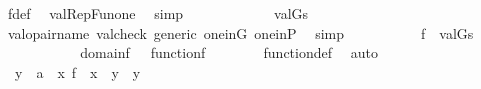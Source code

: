 \begin{isabellebody}
\ f{\isacharunderscore}{\kern0pt}def\ \isamarkupfalse%
\ val{\isacharunderscore}{\kern0pt}RepFun{\isacharunderscore}{\kern0pt}one\ \isamarkupfalse%
\ simp\isanewline
\ \ \ \ \isamarkupfalse%
\isanewline
\ \ \ \ \isamarkupfalse%
\ {\isachardoublequoteopen}{\isachardot}{\kern0pt}{\isachardot}{\kern0pt}{\isachardot}{\kern0pt}\ {\isacharequal}{\kern0pt}\ {\isacharbraceleft}{\kern0pt}{\isasymlangle}{\isasymbeta}{\isacharcomma}{\kern0pt}val{\isacharparenleft}{\kern0pt}G{\isacharcomma}{\kern0pt}s{\isacharbackquote}{\kern0pt}{\isasymbeta}{\isacharparenright}{\kern0pt}{\isasymrangle}\ {\isachardot}{\kern0pt}\ {\isasymbeta}{\isasymin}{\isasymalpha}{\isacharbraceright}{\kern0pt}{\isachardoublequoteclose}\isanewline
\ \ \ \ \ \ \isamarkupfalse%
\ val{\isacharunderscore}{\kern0pt}opair{\isacharunderscore}{\kern0pt}name\ valcheck\ generic\ one{\isacharunderscore}{\kern0pt}in{\isacharunderscore}{\kern0pt}G\ one{\isacharunderscore}{\kern0pt}in{\isacharunderscore}{\kern0pt}P\ \isamarkupfalse%
\ simp\isanewline
\ \ \ \ \isamarkupfalse%
\isanewline
\ \ \ \ \isamarkupfalse%
\ {\isachardoublequoteopen}f\ {\isacharequal}{\kern0pt}\ {\isacharbraceleft}{\kern0pt}{\isasymlangle}{\isasymbeta}{\isacharcomma}{\kern0pt}val{\isacharparenleft}{\kern0pt}G{\isacharcomma}{\kern0pt}s{\isacharbackquote}{\kern0pt}{\isasymbeta}{\isacharparenright}{\kern0pt}{\isasymrangle}\ {\isachardot}{\kern0pt}\ {\isasymbeta}{\isasymin}{\isasymalpha}{\isacharbraceright}{\kern0pt}{\isachardoublequoteclose}\ \isacommand{{\isachardot}{\kern0pt}}\isamarkupfalse%
\isanewline
\ \ \ \ \isamarkupfalse%
\isanewline
\ \ \ \ \isamarkupfalse%
\ {}{\isacharcolon}{\kern0pt}\ {\isachardoublequoteopen}domain{\isacharparenleft}{\kern0pt}f{\isacharparenright}{\kern0pt}\ {\isacharequal}{\kern0pt}\ {\isasymalpha}{\isachardoublequoteclose}\ {\isachardoublequoteopen}function{\isacharparenleft}{\kern0pt}f{\isacharparenright}{\kern0pt}{\isachardoublequoteclose}\isanewline
\ \ \ \ \ \ \isamarkupfalse%
\ function{\isacharunderscore}{\kern0pt}def\ \isamarkupfalse%
\ auto\isanewline
\ \ \ \ \isamarkupfalse%
\ {}{\isacharcolon}{\kern0pt}\ {\isachardoublequoteopen}y\ {\isasymin}\ a\ {\isasymLongrightarrow}\ {\isasymexists}x{\isasymin}{\isasymalpha}{\isachardot}{\kern0pt}\ f\ {\isacharbackquote}{\kern0pt}\ x\ {\isacharequal}{\kern0pt}\ y{\isachardoublequoteclose}\ \ y\isanewline

\end{isabellebody}
